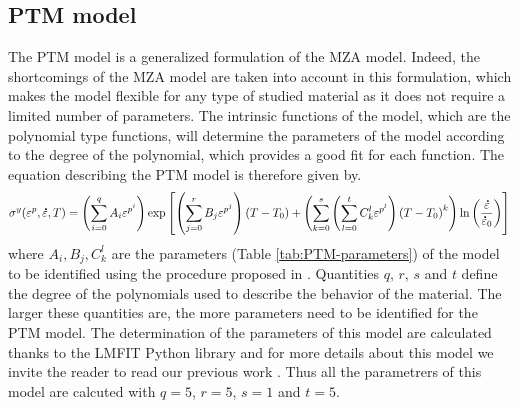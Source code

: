 \documentclass[twoside,english,1p,final,sort&compress]{elsarticle}
\theoremstyle{plain}
\newcommand{\mdot}[1]{\accentset{\mbox{\bfseries .}}{#1}}
\begin{document}
\subsection{PTM model\label{sec:ProposedModel}}
The PTM model is a generalized formulation of the MZA model. Indeed, the shortcomings of the MZA model are taken into account in this formulation, which makes the model flexible for any type of studied material as it does not require a limited number of parameters. The intrinsic functions of the model, which are the polynomial type functions, will determine the parameters of the model according to the degree of the polynomial, which provides a good fit for each function. The equation describing the PTM model is therefore given by.
\begin{equation}
\label{eq:PTM-model}
\sigma^y(\varepsilon^p,\mdot\varepsilon,T) = \left(\sum_{i=0}^{q}{A_i\varepsilon^{p^i}}\right) \exp\left[\left(\sum_{j=0}^{r}{B_j\varepsilon^{p^j}}\right)\left(T-T_0\right) + \left(\sum_{k=0}^{s}\left(\sum_{l=0}^{t}{C_k^l\varepsilon^{p^l}} \right)\left(T-T_0\right)^k \right)\ln\left( \frac{\mdot\varepsilon}{\mdot{\varepsilon}_0}\right)\right]
\end{equation}
where $A_i, B_j, C_k^l$ are the parameters (Table \ref{tab:PTM-parameters}) of the model to be identified using the procedure proposed in  \cite{TizeMha-2022}. Quantities $q$, $r$, $s$ and $t$ define the degree of the polynomials used to describe the behavior of the material. The larger these quantities are, the more parameters need to be identified for the PTM model.
The determination of the parameters of this model are calculated thanks to the LMFIT Python library \cite{Newville-2016} and for more details about this model  we invite the reader to read our previous work \cite{TizeMha-2022}. Thus all the parametrers of this model are calcuted with $q=5$, $r=5$, $s=1$ and $t=5$.
\end{document}
